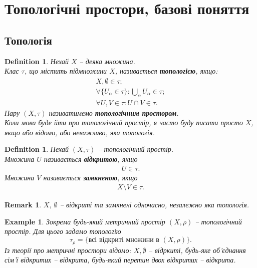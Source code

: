 \documentclass[a4paper, 10pt]{article}
\theoremstyle{theoremdd}
\newtheorem{definition}[theorem]{Definition}
\newtheorem{example}[theorem]{Example}
\newtheorem{remark}[theorem]{Remark}
\begin{document}
\tableofcontents
\newpage

\section{Топологічні простори, базові поняття}
\subsection{Топологія}
\begin{definition}
Нехай $X$ -- деяка множина.\\
Клас $\tau$, що містить підмножини $X$, називається \textbf{топологією}, якщо:
\begin{align*}
X, \emptyset \in \tau; \\
\forall \{U_\alpha \in \tau\}: \bigcup_\alpha U_\alpha \in \tau; \\
\forall U,V \in \tau: U \cap V \in \tau.
\end{align*}
Пару $(X,\tau)$ називатимемо \textbf{топологічним простором}. \\
\textit{Коли мова буде йти про топологічний простір, я часто буду писати просто $X$, якщо або відомо, або неважливо, яка топологія}.
\end{definition}

\begin{definition}
Нехай $(X,\tau)$ -- топологічний простір.\\
Множина $U$ називається \textbf{відкритою}, якщо
\begin{align*}
U \in \tau.
\end{align*}
Множина $V$ називається \textbf{замкненою}, якщо
\begin{align*}
X \setminus V \in \tau.
\end{align*}
\end{definition}

\begin{remark}
$X,\ \emptyset$ -- відкриті та замкнені одночасно, незалежно яка топологія.
\end{remark}

\begin{example}
Зокрема будь-який метричний простір $(X,\rho)$ -- топологічний простір. Для цього задамо топологію
\[
\tau_\rho = \{ \text{всі відкриті множини в } (X,\rho)\}.
\] 
Із теорії про метричні простори відомо: $X, \emptyset$ -- відркиті, будь-яке об'єднання сім'ї відкритих -- відкрита, будь-який перетин двох відкритих -- відкрита.
\end{example}
\end{document}
